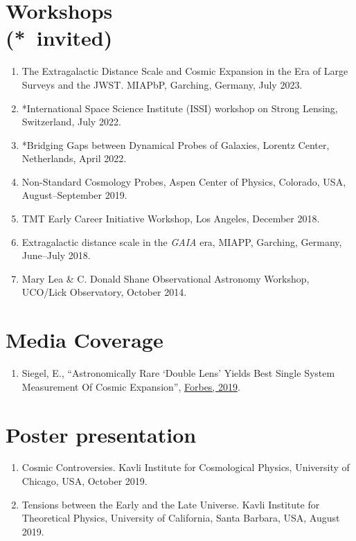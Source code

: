\documentclass[margin, line]{res}
\begin{document}
\begin{resume}
\section{\sc Workshops \\ ({*}\ invited)}
\begin{enumerate}
	\item The Extragalactic Distance Scale and Cosmic Expansion in the Era of Large Surveys and the JWST. MIAPbP, Garching, Germany, July 2023.
	\item *International Space Science Institute (ISSI) workshop on Strong Lensing, Switzerland, July 2022.
	\item *Bridging Gaps between Dynamical Probes of Galaxies, Lorentz Center, Netherlands, April 2022.
	\item Non-Standard Cosmology Probes, Aspen Center of Physics, Colorado, USA, August--September 2019.
	\item TMT Early Career Initiative Workshop, Los Angeles, December 2018.
	\item Extragalactic distance scale in the \textit{GAIA} era, MIAPP, Garching, Germany, June--July 2018.
	\item Mary Lea \& C. Donald Shane Observational Astronomy Workshop, UCO/Lick Observatory, October 2014.
\end{enumerate}


\section{\sc Media Coverage}
\begin{enumerate}
	\item Siegel, E., ``Astronomically Rare `Double Lens' Yields Best Single System Measurement Of Cosmic Expansion'', \href{https://www.forbes.com/sites/startswithabang/2019/10/28/astronomically-rare-double-lens-yields-best-single-system-measurement-of-cosmic-expansion/#55acbc504373}{Forbes, 2019}.	
\end{enumerate}


\section{\sc Poster presentation}
\begin{enumerate}
	\item Cosmic Controversies. Kavli Institute for Cosmological Physics, University of Chicago, USA, October 2019.
	\item Tensions between the Early and the Late Universe. Kavli Institute for Theoretical Physics, University of California, Santa Barbara, USA, August 2019.
\end{enumerate}



\end{resume}
\end{document}
